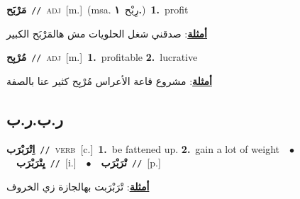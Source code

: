 \documentclass[10pt,a4paper,twoside]{article} %
\begin{document}
\begin{multicols}{2}
{{{{{{{{\setlength\topsep{0pt}\textbf{\foreignlanguage{arabic}{مَرْبَح}}\ {\color{gray}\texttt{//}\color{black}}\ \textsc{adj}\ [m.]\ \color{gray}(msa. \foreignlanguage{arabic}{رِبْح}~\foreignlanguage{arabic}{\textbf{١.}})\color{black}\ \textbf{1.}~profit\  \begin{flushright}\color{gray}\foreignlanguage{arabic}{\textbf{\underline{\foreignlanguage{arabic}{أمثلة}}}: صدقني شغل الحلويات مش هالمَرْبَح الكبير}\end{flushright}\color{black}} \vspace{2mm}

{\setlength\topsep{0pt}\textbf{\foreignlanguage{arabic}{مُرْبِح}}\ {\color{gray}\texttt{//}\color{black}}\ \textsc{adj}\ [m.]\ \textbf{1.}~profitable  \textbf{2.}~lucrative\  \begin{flushright}\color{gray}\foreignlanguage{arabic}{\textbf{\underline{\foreignlanguage{arabic}{أمثلة}}}: مشروع قاعة الأعراس مُرْبِح كثير عنا بالصفة}\end{flushright}\color{black}} \vspace{2mm}

\vspace{-3mm}
\subsection*{\color{blue}\foreignlanguage{arabic}{ر.ب.ر.ب}\color{blue}{}} 

{\setlength\topsep{0pt}\textbf{\foreignlanguage{arabic}{اِتْرَبْرَب}}\ {\color{gray}\texttt{//}\color{black}}\ \textsc{verb}\ [c.]\ \textbf{1.}~be fattened up.  \textbf{2.}~gain a lot of weight\ \ $\bullet$\ \ \setlength\topsep{0pt}\textbf{\foreignlanguage{arabic}{يِتْرَبْرَب}}\ {\color{gray}\texttt{//}\color{black}}\ [i.]\ \ $\bullet$\ \ \setlength\topsep{0pt}\textbf{\foreignlanguage{arabic}{تْرَبْرَب}}\ {\color{gray}\texttt{//}\color{black}}\ [p.]\  \begin{flushright}\color{gray}\foreignlanguage{arabic}{\textbf{\underline{\foreignlanguage{arabic}{أمثلة}}}: تْرَبْرَبت بهالجازة زي الخروف}\end{flushright}\color{black}} \vspace{2mm}

}}}}}}}
\end{multicols}
\end{document}
